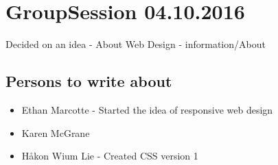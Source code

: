 \documentclass{article}
\begin{document}
    \section{GroupSession 04.10.2016}
    Decided on an idea - About Web Design - information/About\\
    \subsection{Persons to write about}
    \begin{itemize}
        \item {Ethan Marcotte - Started the idea of responsive web design}
        \item {Karen McGrane}
        \item {Håkon Wium Lie - Created CSS version 1}
    \end{itemize}
    
\end{document}
